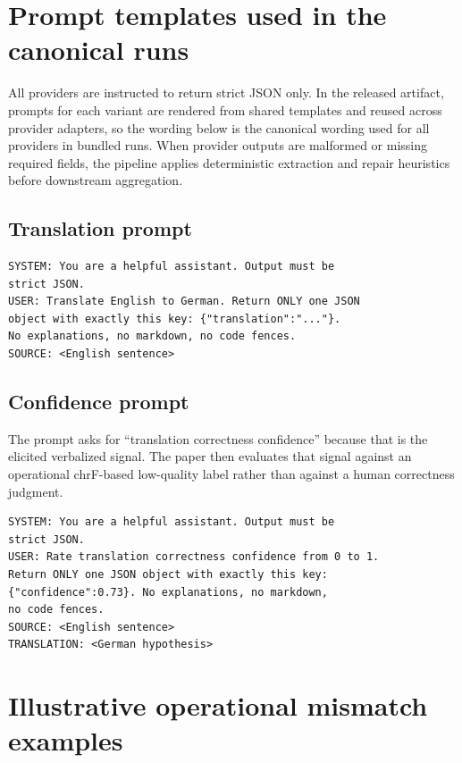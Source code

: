 \documentclass[10pt,conference]{IEEEtran}
\begin{document}



\appendix
\section{Prompt templates used in the canonical runs}
\label{app:prompts}

All providers are instructed to return strict JSON only. In the released artifact, prompts for each variant are rendered from shared templates and reused across provider adapters, so the wording below is the canonical wording used for all providers in bundled runs. When provider outputs are malformed or missing required fields, the pipeline applies deterministic extraction and repair heuristics before downstream aggregation.

\subsection{Translation prompt}
\begin{verbatim}
SYSTEM: You are a helpful assistant. Output must be
strict JSON.
USER: Translate English to German. Return ONLY one JSON
object with exactly this key: {"translation":"..."}.
No explanations, no markdown, no code fences.
SOURCE: <English sentence>
\end{verbatim}

\subsection{Confidence prompt}
The prompt asks for ``translation correctness confidence'' because that is the elicited verbalized signal. The paper then evaluates that signal against an operational chrF-based low-quality label rather than against a human correctness judgment.

\begin{verbatim}
SYSTEM: You are a helpful assistant. Output must be
strict JSON.
USER: Rate translation correctness confidence from 0 to 1.
Return ONLY one JSON object with exactly this key:
{"confidence":0.73}. No explanations, no markdown,
no code fences.
SOURCE: <English sentence>
TRANSLATION: <German hypothesis>
\end{verbatim}

\section{Illustrative operational mismatch examples}
\label{app:examples}
\end{document}
